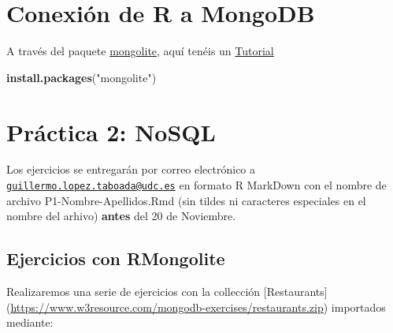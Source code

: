 \documentclass[]{book}
\newenvironment{Shaded}{\begin{snugshade}}{\end{snugshade}}
\newcommand{\CommentTok}[1]{\textcolor[rgb]{0.56,0.35,0.01}{\textit{#1}}}
\newcommand{\DataTypeTok}[1]{\textcolor[rgb]{0.13,0.29,0.53}{#1}}
\newcommand{\KeywordTok}[1]{\textcolor[rgb]{0.13,0.29,0.53}{\textbf{#1}}}
\newcommand{\NormalTok}[1]{#1}
\newcommand{\OperatorTok}[1]{\textcolor[rgb]{0.81,0.36,0.00}{\textbf{#1}}}
\newcommand{\StringTok}[1]{\textcolor[rgb]{0.31,0.60,0.02}{#1}}
\begin{document}
\hypertarget{conexion-de-r-a-mongodb}{%
\section{Conexión de R a MongoDB}\label{conexion-de-r-a-mongodb}}

A través del paquete \href{https://cran.rstudio.com/web/packages/mongolite/mongolite.pdf}{mongolite}, aquí tenéis un \href{https://datascienceplus.com/using-mongodb-with-r/}{Tutorial}

\begin{Shaded}
\begin{Highlighting}[]
\KeywordTok{install.packages}\NormalTok{(}\StringTok{"mongolite"}\NormalTok{)}
\end{Highlighting}
\end{Shaded}

\begin{Shaded}
\end{Shaded}

\hypertarget{practica-2-nosql}{%
\section{Práctica 2: NoSQL}\label{practica-2-nosql}}

Los ejercicios se entregarán por correo electrónico a \href{mailto:guillermo.lopez.taboada@udc.es}{\nolinkurl{guillermo.lopez.taboada@udc.es}} en formato R MarkDown con el nombre de archivo P1-Nombre-Apellidos.Rmd (sin tildes ni caracteres especiales en el nombre del arhivo) \textbf{antes} del 20 de Noviembre.

\hypertarget{ejercicios-con-rmongolite}{%
\subsection{Ejercicios con RMongolite}\label{ejercicios-con-rmongolite}}

Realizaremos una serie de ejercicios con la collección {[}Restaurants{]} (\url{https://www.w3resource.com/mongodb-exercises/restaurants.zip}) importados mediante:
\end{document}
